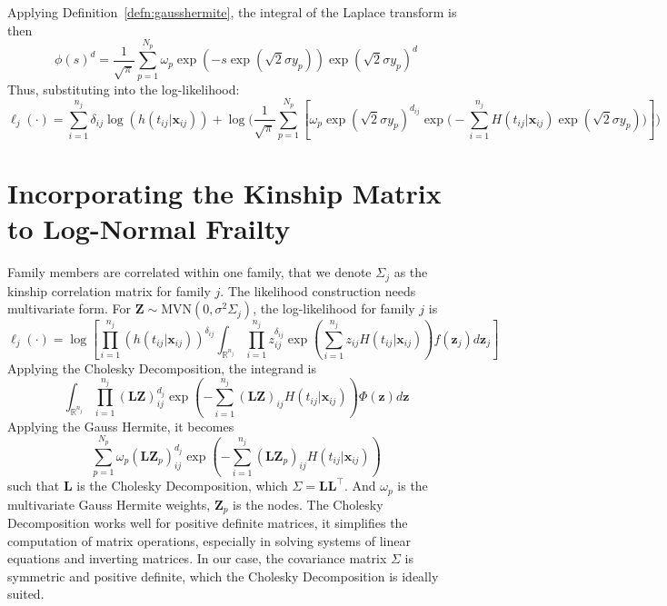 \documentclass[preprint,12pt]{elsarticle}
\begin{document}
\noindent
Applying Definition~\ref{defn:gausshermite}, the integral of the Laplace transform is then
\begin{equation}
    \phi(s)^d=\frac{1}{\sqrt{\pi}}\sum_{p=1}^{N_p}\omega_p\exp(-s\exp(\sqrt{2}\sigma y_p))\exp(\sqrt{2}\sigma y_p)^d
\end{equation}
Thus, substituting into the log-likelihood:
\begin{equation}
    \ell_j(\cdot)=\sum_{i=1}^{n_j}\delta_{ij}\log(h(t_{ij}|\mathbf{x}_{ij}))+\log\Big (\frac{1}{\sqrt{\pi}}\sum_{p=1}^{N_p}\left [\omega_p\exp(\sqrt{2}\sigma y_p)^{d_{ij}}\exp\Big (-\sum_{i=1}^{n_j}H(t_{ij}|\mathbf{x}_{ij})\exp(\sqrt{2}\sigma y_p)\Big )\right ]\Big )
\end{equation}

\section{Incorporating the Kinship Matrix to Log-Normal Frailty}
Family members are correlated within one family, that we denote $\Sigma_j$ as the kinship correlation matrix for family $j$. The likelihood construction needs multivariate form. For $\mathbf{Z}\sim\text{MVN}(0,\sigma^2\Sigma_j)$, the log-likelihood for family $j$ is 
\begin{equation}
    \ell_j(\cdot)=\log\left [\prod_{i=1}^{n_j}(h(t_{ij}|\mathbf{x}_{ij}))^{\delta_{ij}}\int_{\mathbb{R}^{n_j}}\prod_{i=1}^{n_j}z_{ij}^{\delta_{ij}}\exp(\sum_{i=1}^{n_j}z_{ij}H(t_{ij}|\mathbf{x}_{ij}))f(\mathbf{z}_j)d\mathbf{z}_j\right ]
\end{equation}
Applying the Cholesky Decomposition, the integrand is 
\begin{equation}
    \int_{\mathbb{R}^{n_j}}\prod_{i=1}^{n_j}(\mathbf{L}\mathbf{Z})_{ij}^{d_j}\exp(-\sum_{i=1}^{n_j}(\mathbf{L}\mathbf{Z})_{ij} H(t_{ij}|\mathbf{x}_{ij}))\Phi (\mathbf{z})d\mathbf{z}
\end{equation}
Applying the Gauss Hermite, it becomes
\begin{equation}
    \sum_{p=1}^{N_p}\omega_p (\mathbf{L}\mathbf{Z}_p)_{ij}^{d_j}\exp(-\sum_{i=1}^{n_j}(\mathbf{L}\mathbf{Z}_p)_{ij} H(t_{ij}|\mathbf{x}_{ij}))
\end{equation}
such that $\mathbf{L}$ is the Cholesky Decomposition, which $\Sigma=\mathbf{L}\mathbf{L}^{\top}$. And $\omega_p$ is the multivariate Gauss Hermite weights, $\mathbf{Z}_p$ is the nodes. The Cholesky Decomposition works well for positive definite matrices, it simplifies the computation of matrix operations, especially in solving systems of linear equations and inverting matrices. In our case, the covariance matrix $\Sigma$ is symmetric and positive definite, which the Cholesky Decomposition is ideally suited. 
\end{document}
